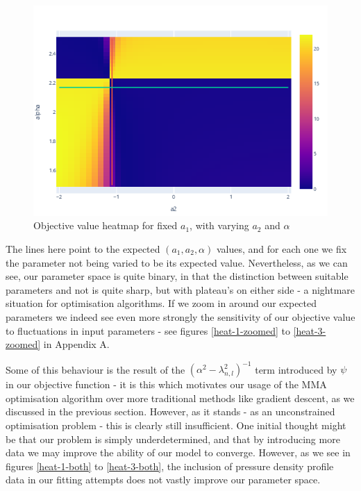 \begin{figure}[h!]
    \centering
    \includegraphics[scale=0.7]{imgs/c4/heat-3-entire.png}
    \caption{Objective value heatmap for fixed $a_1$, with varying 
    $a_2$ and $\alpha$}
    \label{heat-3-entire}
\end{figure}\newpage
The lines here point to the expected $(a_1, a_2, \alpha)$ values, and for each one 
we fix the parameter not being varied to be its expected value. Nevertheless, as we can see, our 
parameter space is quite binary, in that the distinction between suitable parameters and not is quite sharp, 
but with plateau's on either side - a nightmare situation for optimisation algorithms. If we zoom in 
around our expected parameters we indeed see even more strongly the sensitivity of our objective value to fluctuations in 
input parameters - see figures \ref{heat-1-zoomed} to \ref{heat-3-zoomed} in Appendix A.

Some of this behaviour is the result of the $(\alpha^2 - \lambda_{n,l}^2)^{-1}$ term introduced 
by $\psi$ in our objective function - it is this which motivates our usage of the MMA optimisation 
algorithm over more traditional methods like gradient descent, as we discussed in the previous section. 
However, as it stands - as an unconstrained optimisation problem - this is clearly still insufficient. 
One initial thought might be that our problem is simply underdetermined, and that by introducing more 
data we may improve the ability of our model to converge. However, as we see in figures \ref{heat-1-both} to \ref{heat-3-both},
the inclusion of pressure density profile data in our fitting attempts does not vastly improve our parameter space.

